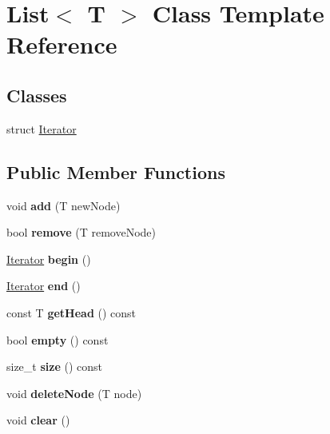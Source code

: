 \hypertarget{classList}{}\section{List$<$ T $>$ Class Template Reference}
\label{classList}
\subsection*{Classes}
\begin{DoxyCompactItemize}
\item 
struct \hyperlink{structList_1_1Iterator}{Iterator}
\end{DoxyCompactItemize}
\subsection*{Public Member Functions}
\begin{DoxyCompactItemize}
\item 
\mbox{\label{classList_a3dc06da23dfd238ae00b624e96ba6ada}} 
void {\bfseries add} (T new\+Node)
\item 
\mbox{\label{classList_a2202c40ee77a36119bf9db394f06d26d}} 
bool {\bfseries remove} (T remove\+Node)
\item 
\mbox{\label{classList_a3cd86b8318ab6be017fd69a71f1e4874}} 
\hyperlink{structList_1_1Iterator}{Iterator} {\bfseries begin} ()
\item 
\mbox{\label{classList_ad860fbbcfb2d693ab4f27fd0aa6125ad}} 
\hyperlink{structList_1_1Iterator}{Iterator} {\bfseries end} ()
\item 
\mbox{\label{classList_acfbd04f036ed938f8281c94d1196f0f0}} 
const T {\bfseries get\+Head} () const
\item 
\mbox{\label{classList_a48efb87cad20cc377b6894f28fa1f3d6}} 
bool {\bfseries empty} () const
\item 
\mbox{\label{classList_ae1a21106dc7f2c47c62763a2f6b04f6b}} 
size\+\_\+t {\bfseries size} () const
\item 
\mbox{\label{classList_a92c3bea8b00f5f84accac07c81f0867d}} 
void {\bfseries delete\+Node} (T node)
\item 
\mbox{\label{classList_ae296516a252e11963dbf963727ce429a}} 
void {\bfseries clear} ()
\end{DoxyCompactItemize}
